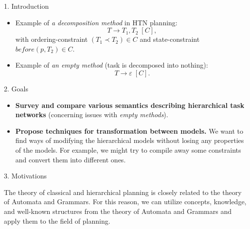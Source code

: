 \documentclass[portrait,a0paper,fontscale=0.25]{baposter}
\begin{document}
\begin{poster}
\begin{posterbox}[column=0,name=intro]{1. Introduction}
\begin{itemize}
    \item Example of \emph{a decomposition method} in HTN planning:
    $$ T \rightarrow T_1, T_2 \; [C],$$ with ordering-constraint $(T_1 \prec T_2) \in C$ and state-constraint $be\!f\!ore(p, T_2) \in C$.

    \item Example of \emph{an empty method} (task is decomposed into nothing):
    $$ T \rightarrow \varepsilon \; [C].$$
\end{itemize}

\end{posterbox}

\begin{posterbox}[column=0, name=goals, below=intro, headerColorOne=cyan!60, boxColorOne=cyan!20]{2. Goals}

\begin{itemize}
    \item \textbf{Survey and compare various semantics describing hierarchical task networks} (concerning issues with \emph{empty methods}).

    \item \textbf{Propose techniques for transformation between models.} We want to find ways of modifying the hierarchical models without losing any properties of the models. For example, we might try to compile away some constraints and convert them into different ones.
\end{itemize}

\end{posterbox}

\begin{posterbox}[column=0, name=motivation, below=goals]{3. Motivations}

The theory of classical and hierarchical planning is closely related to the theory of Automata and Grammars. For this reason, we can utilize concepts, knowledge, and well-known structures from the theory of Automata and Grammars and apply them to the field of planning.

\end{posterbox}

%
%




\end{poster}
\end{document}
